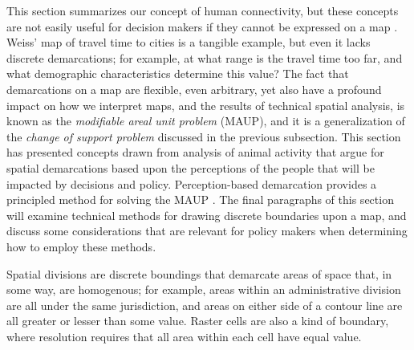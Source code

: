 \documentclass[draft]{article}
\begin{document}

This section summarizes our concept of human connectivity, but these concepts are not easily useful for decision makers if they cannot be expressed on a map \cite{wong15}.  Weiss' map of travel time to cities is a tangible example, but even it lacks discrete demarcations; for example, at what range is the travel time too far, and what demographic characteristics determine this value?  The fact that demarcations on a map are flexible, even arbitrary, yet also have a profound impact on how we interpret maps, and the results of technical spatial analysis, is known as the {\em modifiable areal unit problem} (MAUP), and it is a generalization of the {\em change of support problem} discussed in the previous subsection.  This section has presented concepts drawn from analysis of animal activity that argue for spatial demarcations based upon the perceptions of the people that will be impacted by decisions and policy.  Perception-based demarcation provides a principled method for solving the MAUP \cite{wong12}.  %
The final paragraphs of this section will examine technical methods for drawing discrete boundaries upon a map, and discuss some considerations that are relevant for policy makers when determining how to employ these methods.

Spatial divisions are discrete boundings that demarcate areas of space that, in some way, are homogenous; for example, areas within an administrative division are all under the same jurisdiction, and areas on either side of a contour line are all greater or lesser than some value.  Raster cells are also a kind of boundary, where resolution requires that all area within each cell have equal value.
\end{document}
